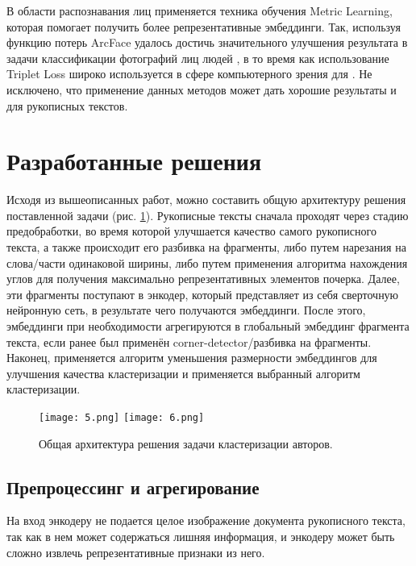     В области распознавания лиц применяется техника обучения Metric Learning, которая помогает получить более репрезентативные эмбеддинги. Так, используя функцию потерь ArcFace удалось достичь значительного улучшения результата в задачи классификации фотографий лиц людей \cite{arcface}, в то время как использование Triplet Loss широко используется в сфере компьютерного зрения для \cite{triplet_loss} \cite{netvlad}. Не исключено, что применение данных методов может дать хорошие результаты и для рукописных текстов.
    
\newpage
\section{Разработанные решения}

    Исходя из вышеописанных работ, можно составить общую архитектуру решения поставленной задачи (рис. \ref{fig:general}). Рукописные тексты сначала проходят через стадию предобработки, во время которой улучшается качество самого рукописного текста, а также происходит его разбивка на фрагменты, либо путем нарезания на слова/части одинаковой ширины, либо путем применения алгоритма нахождения углов для получения максимально репрезентативных элементов почерка.
    Далее, эти фрагменты поступают в энкодер, который представляет из себя сверточную нейронную сеть, в результате чего получаются эмбеддинги. После этого, эмбеддинги при необходимости агрегируются в глобальный эмбеддинг фрагмента текста, если ранее был применён corner-detector/разбивка на фрагменты. Наконец, применяется алгоритм уменьшения размерности эмбеддингов для улучшения качества кластеризации и применяется выбранный алгоритм кластеризации.

    \begin{figure}[htbp]
        \centering
        \texttt{[image: 5.png]}
        \texttt{[image: 6.png]}
        \caption{Общая архитектура решения задачи кластеризации авторов.}
        \label{fig:general}
    \end{figure}

\subsection{Препроцессинг и агрегирование}

    На вход энкодеру не подается целое изображение документа рукописного текста, так как в нем может содержаться лишняя информация, и энкодеру может быть сложно извлечь репрезентативные признаки из него.

